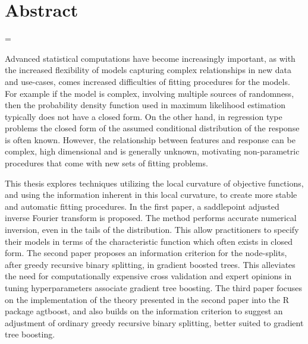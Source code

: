 \chapter*{Abstract}

\emergencystretch=\maxdimen
{}

Advanced statistical computations have become increasingly important, as with the increased flexibility of models capturing complex relationships in new data and use-cases,
comes increased difficulties of fitting procedures for the models.
For example if the model is complex, involving multiple sources of randomness, then the probability density function used in maximum likelihood estimation typically does not have a closed form.
On the other hand, in regression type problems the closed form of the assumed conditional distribution of the response is often known. However, the relationship between features and response can be complex, high dimensional and is generally unknown, motivating non-parametric procedures that come with new sets of fitting problems.


This thesis explores techniques utilizing the local curvature of objective functions, and using the information inherent in this local curvature, to create more stable and automatic fitting procedures.
In the first paper, a saddlepoint adjusted inverse Fourier transform is proposed.
The method performs accurate numerical inversion, even in the tails of the distribution.
This allow practitioners to specify their models in terms of the characteristic function which often exists in closed form.
The second paper proposes an information criterion for the node-splits, after greedy recursive binary splitting, in gradient boosted trees.
This alleviates the need for computationally expensive cross validation and expert opinions in tuning hyperparameters associate gradient tree boosting.
The third paper focuses on the implementation of the theory presented in the second paper into the R package agtboost, and also builds on the information criterion to suggest an adjustment of ordinary greedy recursive binary splitting, better suited to gradient tree boosting.




